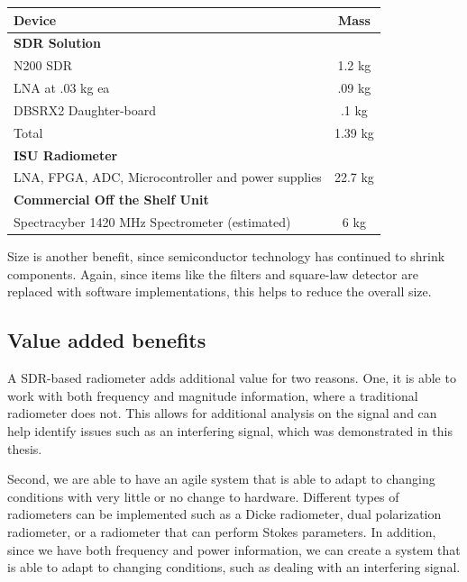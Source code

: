 \begin{table}[h!tb] \centering
{}
\label{weight_table}
\begin{tabular}{lc} \hline
\textbf{Device} & \textbf{Mass} \\ \hline
\textbf{SDR Solution} & \\ \hline
N200 SDR & 1.2 kg \\
LNA at .03 kg ea & .09 kg \\
DBSRX2 Daughter-board & .1 kg \\ \hline
Total & 1.39 kg \\ \hline
\textbf{ISU Radiometer} \\ \hline
LNA, FPGA, ADC, Microcontroller and power supplies & 22.7 kg \\ \hline
\textbf{Commercial Off the Shelf Unit}\\ \hline
Spectracyber 1420 MHz Spectrometer (estimated) & 6 kg \\ \hline

\end{tabular}
\end{table}

Size is another benefit, since semiconductor technology has continued to shrink components.  Again, since items like the filters and square-law detector are replaced with software implementations, this helps to reduce the overall size.  

\subsection{Value added benefits}

A SDR-based radiometer adds additional value for two reasons.  One, it is able to work with both frequency and magnitude information, where a traditional radiometer does not.  This allows for additional analysis on the signal and can help identify issues such as an interfering signal, which was demonstrated in this thesis.  

Second, we are able to have an agile system that is able to adapt to changing conditions with very little or no change to hardware.  Different types of radiometers can be implemented such as a Dicke radiometer, dual polarization radiometer, or a radiometer that can perform Stokes parameters.  In addition, since we have both frequency and power information, we can create a system that is able to adapt to changing conditions, such as dealing with an interfering signal.  

